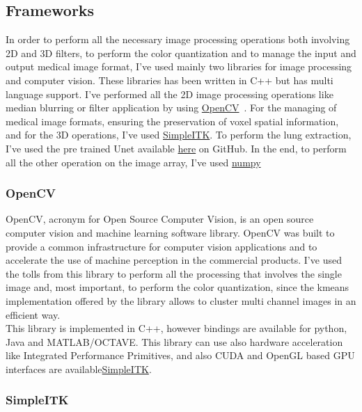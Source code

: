 \documentclass{standalone}
\begin{document}
	
	\subsection{Frameworks}
	
	In order to perform all the necessary image processing operations both involving 2D and 3D filters, to perform the color quantization and to manage the input and output medical image format, I've used mainly two libraries for image processing and computer vision. These libraries has been written in C++ but has multi language support. I've performed all the 2D image processing operations like median blurring or filter application by using \href{https://opencv.org/}{OpenCV}~\cite{OpenCV}. For the managing of medical image formats, ensuring the preservation of voxel spatial information, and for the 3D operations, I've used \href{https://simpleitk.org/}{SimpleITK}. To perform the lung extraction, I've used the pre trained Unet available \href{https://github.com/JoHof/lungmask}{here} on GitHub. In the end, to perform all the other operation on the image array, I've used \href{https://numpy.org/}{numpy}~\cite{Numpy}
	
	\subsubsection*{OpenCV} 
	
	OpenCV, acronym for Open Source Computer Vision,  is an open source computer vision and machine learning software library. OpenCV was built to provide a common infrastructure for computer vision applications and to accelerate the use of machine perception in the commercial products.
	I've used the tolls from this library to perform all the processing that involves the single image and, most important, to perform the color quantization, since the kmeans implementation offered by the library allows to cluster multi channel images in an efficient way.\\	
	This library is implemented in C++, however bindings are available for python, Java and MATLAB/OCTAVE. This library can use also hardware acceleration like Integrated Performance Primitives, and also CUDA and OpenGL based GPU interfaces are available\href{https://simpleitk.org/}{SimpleITK}.\\
	
	\subsubsection*{SimpleITK} 
	
\end{document}
